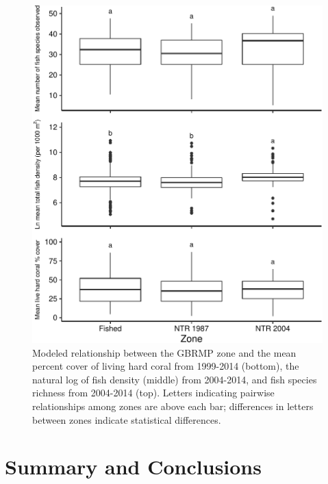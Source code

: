 \documentclass[12pt,]{article}
\begin{document}
\begin{figure}

{\centering \includegraphics{Mullaney_ENV872_Project_files/figure-latex/Zoning Plots-1} 

}

\caption{Modeled relationship between the GBRMP zone and the mean percent cover of living hard coral from 1999-2014 (bottom), the natural log of fish density (middle) from 2004-2014, and fish species richness from 2004-2014 (top). Letters indicating pairwise relationships among zones are above each bar; differences in letters between zones indicate statistical differences.}\label{fig:Zoning Plots}
\end{figure}
\newpage

\hypertarget{summary-and-conclusions}{%
\section{Summary and Conclusions}\label{summary-and-conclusions}}
\end{document}
